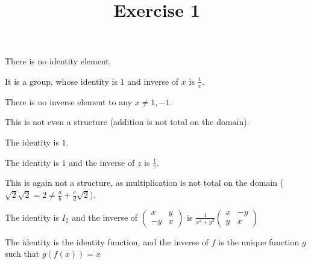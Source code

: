 

\usepackage{skak}
\usepackage{relsize}
\usepackage{graphicx}
\usepackage{mathtools}

\usepackage{textcomp}
\usepackage{bbding}

\usepackage{soul}

\newcommand{\flower}{\text{\scalebox{0.75}{\raisebox{-0.7ex}{
				\rotatebox{90}{\textleaf}\hspace{-0.3em}
				\scalebox{0.7}{\textleaf}\hspace{-1.35em}
				\raisebox{1ex}{\scalebox{0.8}{\FiveFlowerOpen}}
}}}} 
\title{Exercise 1}

\maketitle
\begin{cExercise}[][][author][1]
	\begin{cPart}
		There is no identity element.
	\end{cPart}
	\begin{cPart}
		It is a group, whose identity is $1$ and inverse of $x$ is $\frac1x$.
	\end{cPart}
	\begin{cPart}
		There is no inverse element to any $x\ne 1,-1$.
	\end{cPart}
	\begin{cPart}
		This is not even a structure (addition is not total on the domain).
	\end{cPart}
	\begin{cPart}
		The identity is $1$.
	\end{cPart}
	\begin{cPart}
		The identity is $1$ and the inverse of $z$ is $\frac1z$.
	\end{cPart}
	\begin{cPart}
		This is again not a structure, as multiplication is not total on the domain ($\sqrt2\sqrt2=2\ne \frac ab+\frac cd\sqrt2$).
	\end{cPart}
	\begin{cPart}
		The identity is $I_2$ and the inverse of 
		$
		\begin{pmatrix}
			x & y\\
			-y & x
		\end{pmatrix}
		$ is $\frac1{x^2+y^2}
		\begin{pmatrix}
			x & -y\\
			y & x
		\end{pmatrix}
		$
	\end{cPart}
	\begin{cPart}
		The identity is the identity function, and the inverse of $f$ is the unique function $g$ such that $g(f(x))=x$
	\end{cPart}
\end{cExercise}
